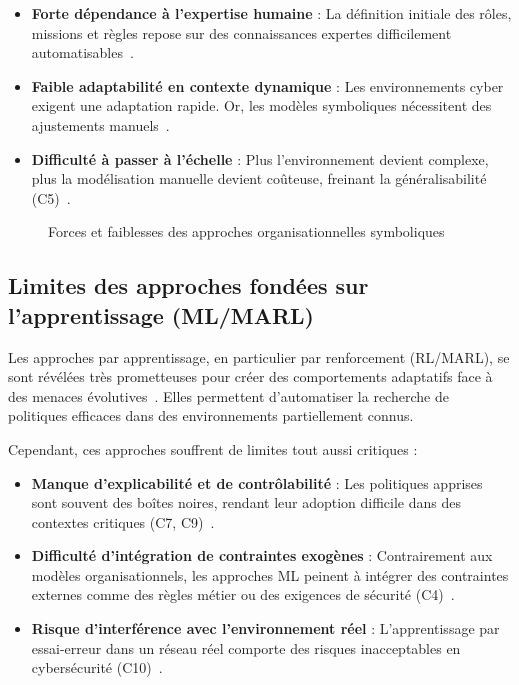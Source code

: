 \documentclass[ twoside,openright,titlepage,numbers=noenddot,headinclude,%
                footinclude=true,cleardoublepage=empty,abstractoff, %
                BCOR=5mm,paper=a4,fontsize=11pt,%
                french,american,%
                ]{scrreprt}
\begin{document}
\begin{itemize}
    \item \textbf{Forte dépendance à l'expertise humaine} : La définition initiale des rôles, missions et règles repose sur des connaissances expertes difficilement automatisables~\cite{Boella2008}.
    \item \textbf{Faible adaptabilité en contexte dynamique} : Les environnements cyber exigent une adaptation rapide. Or, les modèles symboliques nécessitent des ajustements manuels~\cite{Picard2005}.
    \item \textbf{Difficulté à passer à l'échelle} : Plus l'environnement devient complexe, plus la modélisation manuelle devient coûteuse, freinant la généralisabilité (C5)~\cite{Picard2006}.
\end{itemize}

\begin{figure}[H]
    \centering
    \caption{Forces et faiblesses des approches organisationnelles symboliques}
    \label{fig:limits_symbolic}
\end{figure}

\subsection{Limites des approches fondées sur l'apprentissage (ML/MARL)}

Les approches par apprentissage, en particulier par renforcement (RL/MARL), se sont révélées très prometteuses pour créer des comportements adaptatifs face à des menaces évolutives~\cite{Hammar2023}. Elles permettent d'automatiser la recherche de politiques efficaces dans des environnements partiellement connus.

Cependant, ces approches souffrent de limites tout aussi critiques :

\begin{itemize}
    \item \textbf{Manque d'explicabilité et de contrôlabilité} : Les politiques apprises sont souvent des boîtes noires, rendant leur adoption difficile dans des contextes critiques (C7, C9)~\cite{Gunning2019}.
    \item \textbf{Difficulté d'intégration de contraintes exogènes} : Contrairement aux modèles organisationnels, les approches ML peinent à intégrer des contraintes externes comme des règles métier ou des exigences de sécurité (C4)~\cite{Chouldechova2018}.
    \item \textbf{Risque d'interférence avec l'environnement réel} : L'apprentissage par essai-erreur dans un réseau réel comporte des risques inacceptables en cybersécurité (C10)~\cite{kurniawati2011motion}.
\end{itemize}
\end{document}
